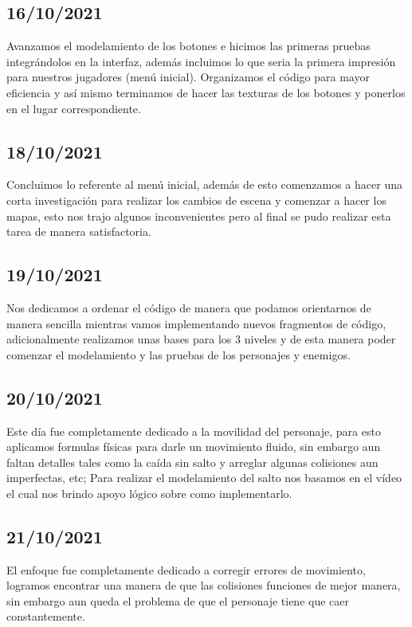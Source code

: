 \documentclass{article}
\begin{document}
    \subsection{16/10/2021}
    Avanzamos el modelamiento de los botones e hicimos las primeras pruebas integrándolos en la interfaz, además incluimos lo que seria la primera impresión para nuestros jugadores (menú inicial). Organizamos el código para mayor eficiencia y así mismo terminamos de hacer las texturas de los botones y ponerlos en el lugar correspondiente.
    
    \subsection{18/10/2021}
    Concluimos lo referente al menú inicial, además de esto comenzamos a hacer una corta investigación para realizar los cambios de escena y comenzar a hacer los mapas, esto nos trajo algunos inconvenientes pero al final se pudo realizar esta tarea de manera satisfactoria.
    
    \subsection{19/10/2021}
    Nos dedicamos a ordenar el código de manera que podamos orientarnos de manera sencilla mientras vamos implementando nuevos fragmentos de código, adicionalmente realizamos unas bases para los 3 niveles y de esta manera poder comenzar el modelamiento y las pruebas de los personajes y enemigos.
    
    \subsection{20/10/2021}
    Este día fue completamente dedicado a la movilidad del personaje, para esto aplicamos formulas físicas para darle un movimiento fluido, sin embargo aun faltan detalles tales como la caída sin salto y arreglar algunas colisiones aun imperfectas, etc; Para realizar el modelamiento del salto nos basamos en el vídeo \cite{video_jump} el cual nos brindo apoyo lógico sobre como implementarlo.
    
    \subsection{21/10/2021}
    El enfoque fue completamente dedicado a corregir errores de movimiento, logramos encontrar una manera de que las colisiones funciones de mejor manera, sin embargo aun queda el problema de que el personaje tiene que caer constantemente.
    
\end{document}
